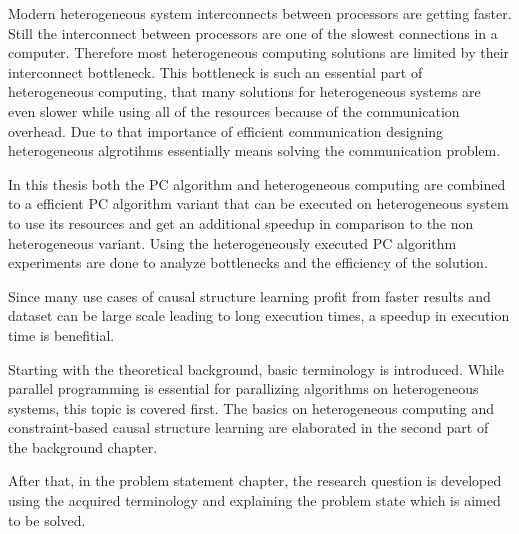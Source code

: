 Modern heterogeneous system interconnects between processors are getting faster. Still the interconnect between processors are one of the slowest connections in a computer. Therefore most heterogeneous computing solutions are limited by their interconnect bottleneck. This bottleneck is such an essential part of heterogeneous computing, that many solutions for heterogeneous systems are even slower while using all of the resources because of the communication overhead. Due to that importance of efficient communication designing heterogeneous algrotihms essentially means solving the communication problem.

In this thesis both the PC algorithm and heterogeneous computing are combined to a efficient PC algorithm variant that can be executed on heterogeneous system to use its resources and get an additional speedup in comparison to the non heterogeneous variant. Using the heterogeneously executed PC algorithm experiments are done to analyze bottlenecks and the efficiency of the solution.

Since many use cases of causal structure learning profit from faster results and dataset can be large scale leading to long execution times, a speedup in execution time is benefitial.

Starting with the theoretical background, basic terminology is introduced. While parallel programming is essential for parallizing algorithms on heterogeneous systems, this topic is covered first. The basics on heterogeneous computing and constraint-based causal structure learning are elaborated in the second part of the background chapter.

After that, in the problem statement chapter, the research question is developed using the acquired terminology and explaining the problem state which is aimed to be solved. 



